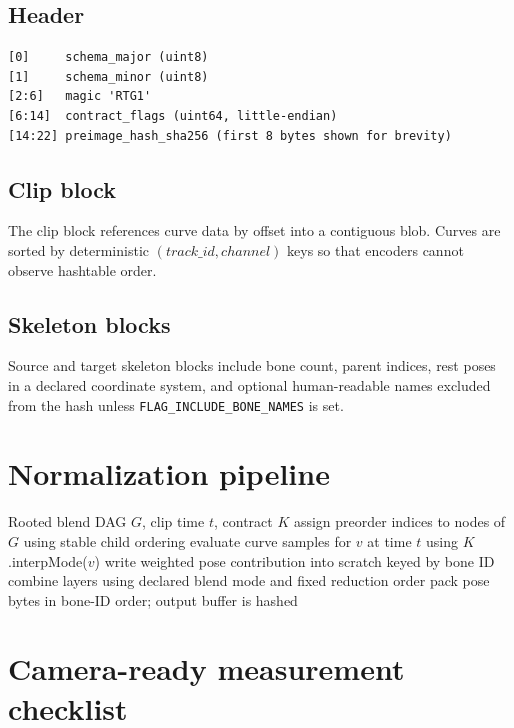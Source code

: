 \documentclass[sigconf,nonacm]{acmart}
\begin{document}
\subsection{Header}
\begin{verbatim}
[0]     schema_major (uint8)
[1]     schema_minor (uint8)
[2:6]   magic 'RTG1'
[6:14]  contract_flags (uint64, little-endian)
[14:22] preimage_hash_sha256 (first 8 bytes shown for brevity)
\end{verbatim}

\subsection{Clip block}
The clip block references curve data by offset into a contiguous blob. Curves
are sorted by deterministic $(track\_id, channel)$ keys so that encoders
cannot observe hashtable order.

\subsection{Skeleton blocks}
Source and target skeleton blocks include bone count, parent indices, rest
poses in a declared coordinate system, and optional human-readable names
excluded from the hash unless \texttt{FLAG\_INCLUDE\_BONE\_NAMES} is set.

\section{Normalization pipeline}
\label{app:norm}

\begin{algorithm}[t]
\caption{Deterministic blend-tree evaluation (outline)}
\label{alg:blend}
\begin{algorithmic}[1]
\Require Rooted blend DAG $G$, clip time $t$, contract $K$
\State assign preorder indices to nodes of $G$ using stable child ordering
  \State evaluate curve samples for $v$ at time $t$ using $K$.interpMode($v$)
  \State write weighted pose contribution into scratch keyed by bone ID
\EndFor
\State combine layers using declared blend mode and fixed reduction order
\State pack pose bytes in bone-ID order; output buffer is hashed
\end{algorithmic}
\end{algorithm}

\section{Camera-ready measurement checklist}
\label{app:checklist}
\end{document}

